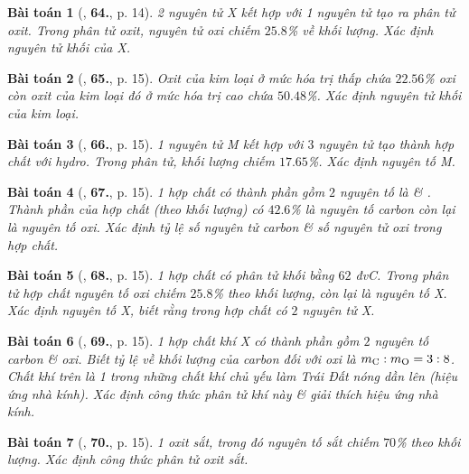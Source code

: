 \documentclass{article}
\numberwithin{equation}{section}
\newtheorem{baitoan}{Bài toán}[section]
\begin{document}
\begin{baitoan}[\cite{An2011}, \textbf{64.}, p. 14]
	2 nguyên tử X kết hợp với 1 nguyên tử  tạo ra phân tử oxit. Trong phân tử oxit, nguyên tử oxi chiếm $25.8$\% về khối lượng. Xác định nguyên tử khối của X.
\end{baitoan}

\begin{baitoan}[\cite{An2011}, \textbf{65.}, p. 15]
	Oxit của kim loại ở mức hóa trị thấp chứa $22.56$\% oxi còn oxit của kim loại đó ở mức hóa trị cao chứa $50.48$\%. Xác định nguyên tử khối của kim loại.
\end{baitoan}

\begin{baitoan}[\cite{An2011}, \textbf{66.}, p. 15]
	1 nguyên tử M kết hợp với $3$ nguyên tử  tạo thành hợp chất với hydro. Trong phân tử, khối lượng  chiếm $17.65$\%. Xác định nguyên tố M.
\end{baitoan}

\begin{baitoan}[\cite{An2011}, \textbf{67.}, p. 15]
	1 hợp chất có thành phần gồm $2$ nguyên tố là  \& . Thành phần của hợp chất (theo khối lượng) có $42.6$\% là nguyên tố carbon còn lại là nguyên tố oxi. Xác định tỷ lệ số nguyên tử carbon \& số nguyên tử oxi trong hợp chất.
\end{baitoan}

\begin{baitoan}[\cite{An2011}, \textbf{68.}, p. 15]
	1 hợp chất có phân tử khối bằng $62$ đvC. Trong phân tử hợp chất nguyên tố oxi chiếm $25.8$\% theo khối lượng, còn lại là nguyên tố X. Xác định nguyên tố X, biết rằng trong hợp chất có $2$ nguyên tử X.
\end{baitoan}

\begin{baitoan}[\cite{An2011}, \textbf{69.}, p. 15]
	1 hợp chất khí X có thành phần gồm $2$ nguyên tố carbon \& oxi. Biết tỷ lệ về khối lượng của carbon đối với oxi là $m_{\rm C}:m_{\rm O} = 3:8$. Chất khí trên là 1 trong những chất khí chủ yếu làm Trái Đất nóng dần lên (hiệu ứng nhà kính). Xác định công thức phân tử khí này \& giải thích hiệu ứng nhà kính.
\end{baitoan}

\begin{baitoan}[\cite{An2011}, \textbf{70.}, p. 15]
	1 oxit sắt, trong đó nguyên tố sắt chiếm $70$\% theo khối lượng. Xác định công thức phân tử oxit sắt.
\end{baitoan}
\end{document}
